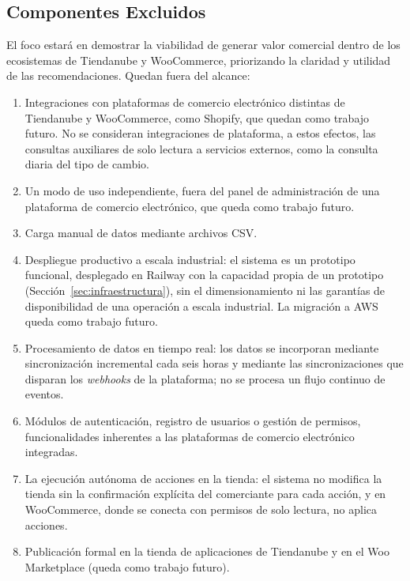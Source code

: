 \subsection{Componentes Excluidos}

El foco estará en demostrar la viabilidad de generar valor comercial dentro de los ecosistemas de Tiendanube y WooCommerce, priorizando la claridad y utilidad de las recomendaciones. Quedan fuera del alcance:

\begin{enumerate}
    \item Integraciones con plataformas de comercio electrónico distintas de Tiendanube y WooCommerce, como Shopify, que quedan como trabajo futuro. No se consideran integraciones de plataforma, a estos efectos, las consultas auxiliares de solo lectura a servicios externos, como la consulta diaria del tipo de cambio.

    \item Un modo de uso independiente, fuera del panel de administración de una plataforma de comercio electrónico, que queda como trabajo futuro.

    \item Carga manual de datos mediante archivos CSV.

    \item Despliegue productivo a escala industrial: el sistema es un prototipo funcional, desplegado en Railway con la capacidad propia de un prototipo (Sección~\ref{sec:infraestructura}), sin el dimensionamiento ni las garantías de disponibilidad de una operación a escala industrial. La migración a AWS queda como trabajo futuro.

    \item Procesamiento de datos en tiempo real: los datos se incorporan mediante sincronización incremental cada seis horas y mediante las sincronizaciones que disparan los \emph{webhooks} de la plataforma; no se procesa un flujo continuo de eventos.

    \item Módulos de autenticación, registro de usuarios o gestión de permisos, funcionalidades inherentes a las plataformas de comercio electrónico integradas.

    \item La ejecución autónoma de acciones en la tienda: el sistema no modifica la tienda sin la confirmación explícita del comerciante para cada acción, y en WooCommerce, donde se conecta con permisos de solo lectura, no aplica acciones.

    \item Publicación formal en la tienda de aplicaciones de Tiendanube y en el Woo Marketplace (queda como trabajo futuro).
\end{enumerate}

